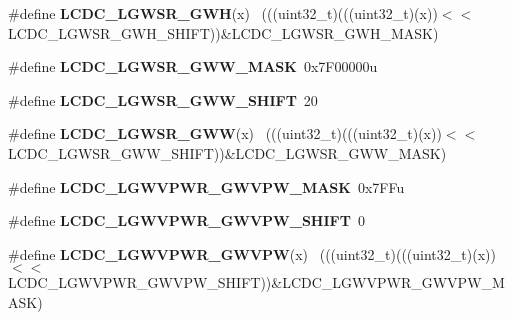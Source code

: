 \begin{DoxyCompactItemize}
\item 
\hypertarget{group___l_c_d_c___register___masks_gae083dc1849fccd815da55968dc9439df}{}\#define {\bfseries L\+C\+D\+C\+\_\+\+L\+G\+W\+S\+R\+\_\+\+G\+W\+H}(x)                                            ~(((uint32\+\_\+t)(((uint32\+\_\+t)(x))$<$$<$L\+C\+D\+C\+\_\+\+L\+G\+W\+S\+R\+\_\+\+G\+W\+H\+\_\+\+S\+H\+I\+F\+T))\&L\+C\+D\+C\+\_\+\+L\+G\+W\+S\+R\+\_\+\+G\+W\+H\+\_\+\+M\+A\+S\+K)\label{group___l_c_d_c___register___masks_gae083dc1849fccd815da55968dc9439df}

\item 
\hypertarget{group___l_c_d_c___register___masks_ga8367ad9b3ce8590beb979fb7c2a35870}{}\#define {\bfseries L\+C\+D\+C\+\_\+\+L\+G\+W\+S\+R\+\_\+\+G\+W\+W\+\_\+\+M\+A\+S\+K}~0x7\+F00000u\label{group___l_c_d_c___register___masks_ga8367ad9b3ce8590beb979fb7c2a35870}

\item 
\hypertarget{group___l_c_d_c___register___masks_gaa135984275d7597d628239a1e085ca84}{}\#define {\bfseries L\+C\+D\+C\+\_\+\+L\+G\+W\+S\+R\+\_\+\+G\+W\+W\+\_\+\+S\+H\+I\+F\+T}~20\label{group___l_c_d_c___register___masks_gaa135984275d7597d628239a1e085ca84}

\item 
\hypertarget{group___l_c_d_c___register___masks_ga7abe7c020eaa097454e1fe0ae1676f9c}{}\#define {\bfseries L\+C\+D\+C\+\_\+\+L\+G\+W\+S\+R\+\_\+\+G\+W\+W}(x)                                            ~(((uint32\+\_\+t)(((uint32\+\_\+t)(x))$<$$<$L\+C\+D\+C\+\_\+\+L\+G\+W\+S\+R\+\_\+\+G\+W\+W\+\_\+\+S\+H\+I\+F\+T))\&L\+C\+D\+C\+\_\+\+L\+G\+W\+S\+R\+\_\+\+G\+W\+W\+\_\+\+M\+A\+S\+K)\label{group___l_c_d_c___register___masks_ga7abe7c020eaa097454e1fe0ae1676f9c}

\item 
\hypertarget{group___l_c_d_c___register___masks_ga105497193100bfbb3cff26412f4954b4}{}\#define {\bfseries L\+C\+D\+C\+\_\+\+L\+G\+W\+V\+P\+W\+R\+\_\+\+G\+W\+V\+P\+W\+\_\+\+M\+A\+S\+K}~0x7\+F\+Fu\label{group___l_c_d_c___register___masks_ga105497193100bfbb3cff26412f4954b4}

\item 
\hypertarget{group___l_c_d_c___register___masks_gaa98fc2ce072c5c193554455ec3205035}{}\#define {\bfseries L\+C\+D\+C\+\_\+\+L\+G\+W\+V\+P\+W\+R\+\_\+\+G\+W\+V\+P\+W\+\_\+\+S\+H\+I\+F\+T}~0\label{group___l_c_d_c___register___masks_gaa98fc2ce072c5c193554455ec3205035}

\item 
\hypertarget{group___l_c_d_c___register___masks_ga2ae2a8ef17be6e8ee5fcf5f0621fd2cb}{}\#define {\bfseries L\+C\+D\+C\+\_\+\+L\+G\+W\+V\+P\+W\+R\+\_\+\+G\+W\+V\+P\+W}(x)                                    ~(((uint32\+\_\+t)(((uint32\+\_\+t)(x))$<$$<$L\+C\+D\+C\+\_\+\+L\+G\+W\+V\+P\+W\+R\+\_\+\+G\+W\+V\+P\+W\+\_\+\+S\+H\+I\+F\+T))\&L\+C\+D\+C\+\_\+\+L\+G\+W\+V\+P\+W\+R\+\_\+\+G\+W\+V\+P\+W\+\_\+\+M\+A\+S\+K)\label{group___l_c_d_c___register___masks_ga2ae2a8ef17be6e8ee5fcf5f0621fd2cb}


\end{DoxyCompactItemize}
